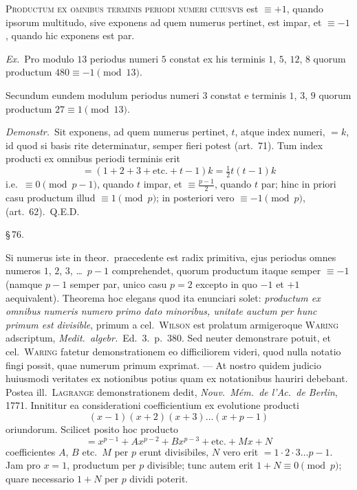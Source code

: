 \documentclass[12pt,a4paper]{article}
\theoremstyle{plain}
\theoremstyle{definition}
\theoremstyle{remark}
\begin{document}
\textsc{Productum ex omnibus terminis periodi numeri cuiusvis} est $\equiv +1$, quando ipsorum multitudo, sive exponens ad quem numerus pertinet, est impar, et $\equiv -1$, quando hic exponens est par.

\textit{Ex.}\ Pro modulo $13$ periodus numeri $5$ constat ex his terminis $1$, $5$, $12$, $8$ quorum productum $480 \equiv -1 \pmod{13}$.

Secundum eundem modulum periodus numeri $3$ constat e terminis $1$, $3$, $9$ quorum productum $27 \equiv 1 \pmod{13}$.

\textit{Demonstr.}\ Sit exponens, ad quem numerus pertinet, $t$, atque index numeri, $= k$, id quod si basis rite determinatur, semper fieri potest (art.~71). Tum index producti ex omnibus periodi terminis erit
\[
= (1 + 2 + 3 + \text{etc.} + t - 1)k = \tfrac{1}{2}t(t-1)k
\]
i.e.\ $\equiv 0 \pmod{p-1}$, quando $t$ impar, et $\equiv \frac{p-1}{2}$, quando $t$ par; hinc in priori casu productum illud $\equiv 1 \pmod{p}$; in posteriori vero $\equiv -1 \pmod{p}$, (art.~62).\ Q.E.D.

\begin{center}\S\,76.\end{center}

Si numerus iste in theor.\ praecedente est radix primitiva, ejus periodus omnes numeros $1$, $2$, $3$, \dots\ $p-1$ comprehendet, quorum productum itaque semper $\equiv -1$ (namque $p-1$ semper par, unico casu $p = 2$ excepto in quo $-1$ et $+1$ aequivalent). Theorema hoc elegans quod ita enunciari solet: \emph{productum ex omnibus numeris numero primo dato minoribus, unitate auctum per hunc primum est divisible}, primum a cel.\ \textsc{Wilson} est prolatum armigeroque \textsc{Waring} adscriptum, \emph{Medit.\ algebr.}\ Ed.~3.\ p.~380. Sed neuter demonstrare potuit, et cel.\ \textsc{Waring} fatetur demonstrationem eo difficiliorem videri, quod nulla notatio fingi possit, quae numerum primum exprimat. --- At nostro quidem judicio huiusmodi veritates ex notionibus potius quam ex notationibus hauriri debebant. Postea ill.\ \textsc{Lagrange} demonstrationem dedit, \emph{Nouv.\ M\'em.\ de l'Ac.\ de Berlin}, 1771. Innititur ea considerationi coefficientium ex evolutione producti
\[
(x-1)(x+2)(x+3)\dots(x+p-1)
\]
oriundorum. Scilicet posito hoc producto
\[
= x^{p-1} + Ax^{p-2} + Bx^{p-3} + \text{etc.} + Mx + N
\]
coefficientes $A$, $B$ etc.\ $M$ per $p$ erunt divisibiles, $N$ vero erit $= 1 \cdot 2 \cdot 3 \dots p-1$. Jam pro $x = 1$, productum per $p$ divisible; tunc autem erit $1 + N \equiv 0 \pmod{p}$; quare necessario $1 + N$ per $p$ dividi poterit.
\end{document}
